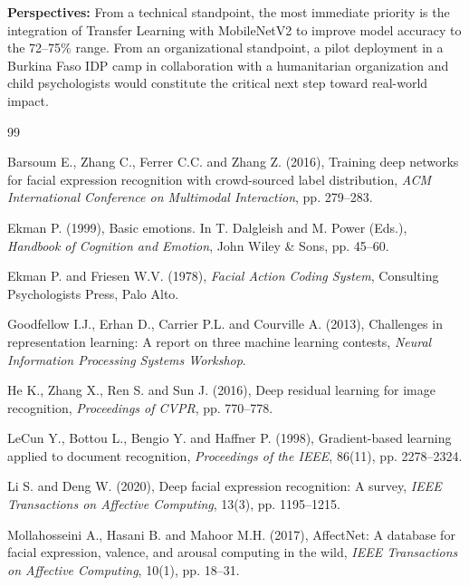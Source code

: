 \documentclass[a4paper,12pt,oneside]{report}
\begin{document}
\textbf{Perspectives:} From a technical standpoint, the most immediate priority is
the integration of Transfer Learning with MobileNetV2 to improve model accuracy to
the 72--75\% range. From an organizational standpoint, a pilot deployment in a
Burkina Faso IDP camp in collaboration with a humanitarian organization and child
psychologists would constitute the critical next step toward real-world impact.

\clearpage

\justifying

\begin{thebibliography}{99}

Barsoum E., Zhang C., Ferrer C.C. and Zhang Z. (2016),
Training deep networks for facial expression recognition with crowd-sourced label
distribution,
\textit{ACM International Conference on Multimodal Interaction}, pp. 279--283.

Ekman P. (1999),
Basic emotions. In T. Dalgleish and M. Power (Eds.),
\textit{Handbook of Cognition and Emotion},
John Wiley \& Sons, pp. 45--60.

Ekman P. and Friesen W.V. (1978),
\textit{Facial Action Coding System},
Consulting Psychologists Press, Palo Alto.

Goodfellow I.J., Erhan D., Carrier P.L. and Courville A. (2013),
Challenges in representation learning: A report on three machine learning contests,
\textit{Neural Information Processing Systems Workshop}.

He K., Zhang X., Ren S. and Sun J. (2016),
Deep residual learning for image recognition,
\textit{Proceedings of CVPR}, pp. 770--778.

LeCun Y., Bottou L., Bengio Y. and Haffner P. (1998),
Gradient-based learning applied to document recognition,
\textit{Proceedings of the IEEE}, 86(11), pp. 2278--2324.

Li S. and Deng W. (2020),
Deep facial expression recognition: A survey,
\textit{IEEE Transactions on Affective Computing}, 13(3), pp. 1195--1215.

Mollahosseini A., Hasani B. and Mahoor M.H. (2017),
AffectNet: A database for facial expression, valence, and arousal computing
in the wild,
\textit{IEEE Transactions on Affective Computing}, 10(1), pp. 18--31.


\end{thebibliography}
\end{document}
